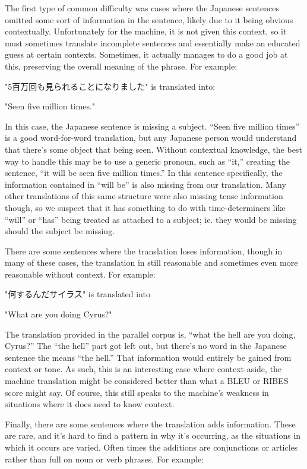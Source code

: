 \documentclass[11pt]{article}
\begin{document}
The first type of common difficulty was cases where the Japanese sentences omitted some sort of information in the sentence, likely due to it being obvious contextually. Unfortunately for the machine, it is not given this context, so it must sometimes translate incomplete sentences and essentially make an educated guess at certain contexts. Sometimes, it actually manages to do a good job at this, preserving the overall meaning of the phrase. For example: 

"5百万回も見られることになりました"  is translated into: 

"Seen five million times."

In this case, the Japanese sentence is missing a subject. “Seen five million times” is a good word-for-word translation, but any Japanese person would understand that there’s some object that being seen. Without contextual knowledge, the best way to handle this may be to use a generic pronoun, such as “it,” creating the sentence, “it will be seen five million times.” In this sentence specifically, the information contained in “will be” is also missing from our translation. Many other translations of this same structure were also missing tense information though, so we suspect that it has something to do with time-determiners like “will” or “has” being treated as attached to a subject; ie. they would be missing should the subject be missing.

There are some sentences where the translation loses information, though in many of these cases, the translation in still reasonable and sometimes even more reasonable without context. For example:

"何するんだサイラス" is translated into

"What are you doing Cyrus?"

The translation provided in the parallel corpus is, “what the hell are you doing, Cyrus?” The “the hell” part got left out, but there’s no word in the Japanese sentence the means “the hell.” That information would entirely be gained from context or tone. As such, this is an interesting case where context-aside, the machine translation might be considered better than what a BLEU or RIBES score might say. Of course, this still speaks to the machine’s weakness in situations where it does need to know context.

Finally, there are some sentences where the translation adds information. These are rare, and it’s hard to find a pattern in why it’s occurring, as the situations in which it occurs are varied. Often times the additions are conjunctions or articles rather than full on noun or verb phrases. For example: 
\end{document}
